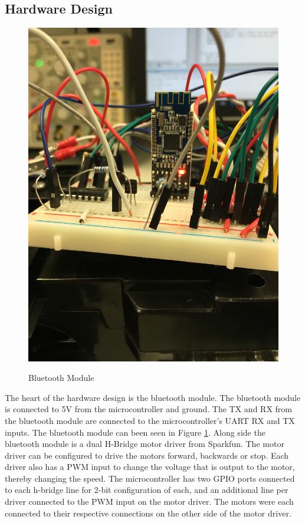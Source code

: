 \documentclass[12pt]{article}
\begin{document}
\subsection{Hardware Design}

\begin{figure}[H]
\begin {center}
\includegraphics[scale=.10]{bluetooth}\\
\caption{Bluetooth Module}
\label{fig:bluetooth}
\end {center}
\end{figure}

The heart of the hardware design is the bluetooth module. The bluetooth module is connected to 5V from the microcontroller and ground. The TX and RX from the bluetooth module are connected to the microcontroller's UART RX and TX inputs. The bluetooth module can been seen in Figure \ref{fig:bluetooth}. Along side the bluetooth module is a dual H-Bridge motor driver from Sparkfun. The motor driver can be configured to drive the motors forward, backwards or stop. Each driver also has a PWM input to change the voltage that is output to the motor, thereby changing the speed. The microcontroller has two GPIO ports connected to each h-bridge line for 2-bit configuration of each, and an additional line per driver connected to the PWM input on the motor driver. The motors were each connected to their respective connections on the other side of the motor driver. 
\end{document}
